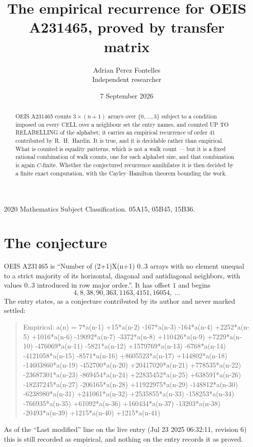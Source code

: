 \documentclass[11pt,a4paper]{article}
\title{The empirical recurrence for OEIS A231465, proved by transfer matrix}
\author{Adrian Perez Fontelles\\ \small Independent researcher}
\date{7 September 2026}
\theoremstyle{plain}
\theoremstyle{definition}
\begin{document}
\maketitle

\begin{abstract}
OEIS A231465 counts $3\times(n+1)$ arrays over $\{0,\dots,3\}$ subject to a condition imposed on
every CELL over a neighbour set the entry names, and counted UP TO RELABELLING of the
alphabet; it carries an empirical recurrence of order $41$ contributed by
R.~H.~Hardin. It is true, and it is decidable rather than empirical. What is counted is
equality patterns, which is not a walk count --- but it is a fixed rational combination of
walk counts, one for each alphabet size, and that combination is again $C$-finite. Whether the
conjectured recurrence annihilates it is then decided by a finite exact computation, with the
Cayley--Hamilton theorem bounding the work.
\end{abstract}

\noindent\small 2020 Mathematics Subject Classification. 05A15, 05B45, 15B36.\normalsize

\section{The conjecture}

OEIS A231465 is ``Number of (2+1)X(n+1) 0..3 arrays with no element unequal to a strict majority of its horizontal, diagonal and antidiagonal neighbors, with values 0..3 introduced in row major order.''. It has offset $1$ and begins
\[
4, 8, 38, 90, 363, 1163, 4151, 16054,\ \dots
\]
The entry states, as a conjecture contributed by its author and never marked settled:
\begin{quote}
Empirical: a(n) = 7*a(n-1) +15*a(n-2) -167*a(n-3) -164*a(n-4) +2252*a(n-5) +1016*a(n-6) -19092*a(n-7) -3372*a(n-8) +110426*a(n-9) +7229*a(n-10) -476069*a(n-11) -5821*a(n-12) +1579769*a(n-13) -6768*a(n-14) -4121058*a(n-15) -8571*a(n-16) +8605523*a(n-17) +144802*a(n-18) -14603860*a(n-19) -452700*a(n-20) +20417020*a(n-21) +778535*a(n-22) -23687301*a(n-23) -869454*a(n-24) +22835452*a(n-25) +638591*a(n-26) -18237245*a(n-27) -206165*a(n-28) +11922975*a(n-29) -148812*a(n-30) -6238980*a(n-31) +241061*a(n-32) +2535855*a(n-33) -158253*a(n-34) -766935*a(n-35) +61092*a(n-36) +160434*a(n-37) -13203*a(n-38) -20493*a(n-39) +1215*a(n-40) +1215*a(n-41)
\end{quote}
As of the ``Last modified'' line on the live entry (Jul 23 2025 06:32:11, revision 6) this is still
recorded as empirical, and nothing on the entry records it as proved.
\end{document}
